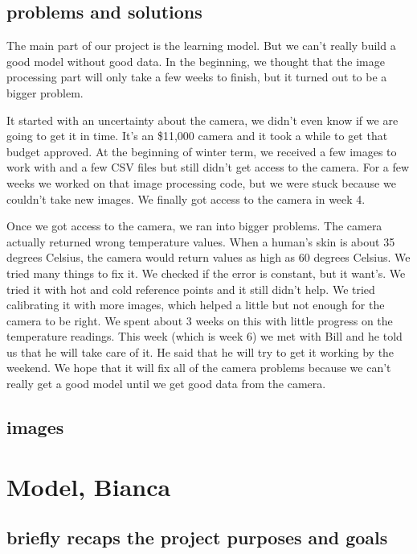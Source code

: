 \documentclass[onecolumn, draftclsnofoot,10pt, compsoc]{IEEEtran}
\begin{document}
\subsection{problems and solutions}
The main part of our project is the learning model. But we can’t really build a good model without good data. In the beginning, we thought that the image processing part will only take a few weeks to finish, but it turned out to be a bigger problem. 


It started with an uncertainty about the camera, we didn’t even know if we are going to get it in time. It’s an \$11,000 camera and it took a while to get that budget approved. At the beginning of winter term, we received a few images to work with and a few CSV files but still didn’t get access to the camera. For a few weeks we worked on that image processing code, but we were stuck because we couldn’t take new images. We finally got access to the camera in week 4. 

Once we got access to the camera, we ran into bigger problems. The camera actually returned wrong temperature values. When a human’s skin is about 35 degrees Celsius, the camera would return values as high as 60 degrees Celsius.  We tried many things to fix it. We checked if the error is constant, but it want’s.  We tried it with hot and cold reference points and it still didn’t help. We tried calibrating it with more images, which helped a little but not enough for the camera to be right. We spent about 3 weeks on this with little progress on the temperature readings. This week (which is week 6) we met with Bill and he told us that he will take care of it. He said that he will try to get it working by the weekend. We hope that it will fix all of the camera problems because we can’t really get a good model until we get good data from the camera.\cite{ClaudeTech}

\subsection{images}


\section{Model, Bianca}

\subsection{briefly recaps the project purposes and goals}
\end{document}
